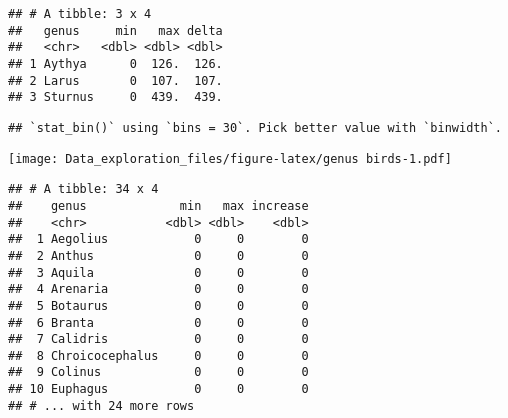 \documentclass[]{article}
\newenvironment{Shaded}{\begin{snugshade}}{\end{snugshade}}
\newcommand{\KeywordTok}[1]{\textcolor[rgb]{0.13,0.29,0.53}{\textbf{#1}}}
\newcommand{\DataTypeTok}[1]{\textcolor[rgb]{0.13,0.29,0.53}{#1}}
\newcommand{\DecValTok}[1]{\textcolor[rgb]{0.00,0.00,0.81}{#1}}
\newcommand{\StringTok}[1]{\textcolor[rgb]{0.31,0.60,0.02}{#1}}
\newcommand{\CommentTok}[1]{\textcolor[rgb]{0.56,0.35,0.01}{\textit{#1}}}
\newcommand{\OperatorTok}[1]{\textcolor[rgb]{0.81,0.36,0.00}{\textbf{#1}}}
\newcommand{\NormalTok}[1]{#1}
\begin{document}
\begin{verbatim}
## # A tibble: 3 x 4
##   genus     min   max delta
##   <chr>   <dbl> <dbl> <dbl>
## 1 Aythya      0  126.  126.
## 2 Larus       0  107.  107.
## 3 Sturnus     0  439.  439.
\end{verbatim}

\begin{Shaded}
\end{Shaded}

\begin{verbatim}
## `stat_bin()` using `bins = 30`. Pick better value with `binwidth`.
\end{verbatim}

\texttt{[image: Data\_exploration\_files/figure-latex/genus birds-1.pdf]}

\begin{Shaded}
\end{Shaded}

\begin{verbatim}
## # A tibble: 34 x 4
##    genus             min   max increase
##    <chr>           <dbl> <dbl>    <dbl>
##  1 Aegolius            0     0        0
##  2 Anthus              0     0        0
##  3 Aquila              0     0        0
##  4 Arenaria            0     0        0
##  5 Botaurus            0     0        0
##  6 Branta              0     0        0
##  7 Calidris            0     0        0
##  8 Chroicocephalus     0     0        0
##  9 Colinus             0     0        0
## 10 Euphagus            0     0        0
## # ... with 24 more rows
\end{verbatim}
\end{document}
